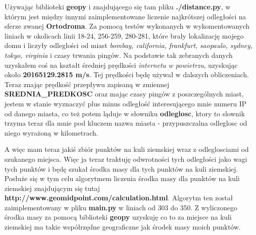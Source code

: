 \documentclass[11pt,a4paper]{article}
\begin{document}
Używając biblioteki \textbf{geopy} i znajdującego się tam pliku \textbf{./distance.py}, w którym jest między innymi zaimplementowane liczenie najkrótszej odległości na sferze zwanej \textbf{Ortodroma}. Za pomocą testów wykonanych w wykomentowanych liniach w okolicach linii 18-24, 256-259, 280-281, które brały lokalizację mojego domu i liczyły odleglości od miast \textit{bombay, california, frankfurt, saopaulo, sydney, tokyo, virginia} i czasy trwania pingów. Na podstawie tak zebranych danych uzyskałem coś na kształt
średniej prędkości \textit{internetu w powietrzu}, uzyskując około \textbf{20165129.2815 m/s}. Tej prędkości będę używał w dalszych obliczeniach. Teraz znając prędkość przepływu zapisaną w zmiennej \textbf{SREDNIA\_PREDKOSC} oraz mając czasy pingów z poszczególnych miast, jestem w stanie wyznaczyć plus minus odległość interesującego mnie numeru IP od danego miasta, co też potem ląduje w słowniku \textbf{odleglosc}, ktory to slownik trzyma teraz dla mnie pod kluczem nazwa miasta - przypuszczalna odleglosc od niego wyrażoną w kilometrach.

A więc mam teraz jakiś zbiór punktów na kuli ziemskiej wraz z odleglosciami od szukanego miejsca. Więc ja teraz traktuję odwrotności tych odległości jako wagi tych punktów i będę szukał środka masy dla tych punktów na kuli ziemskiej. Posłuże się w tym celu algorytmem liczenia środka masy dla punktów na kuli ziemskiej znajdującym się tutaj \textbf{http://www.geomidpoint.com/calculation.html}. Algorytm ten został zaimplementowany w pliku \textbf{main.py} w liniach od 303 do 350. Z wyliczonego środka masy za pomocą biblioteki \textbf{geopy} uzyskuję co to za miejsce na kuli ziemskiej ma takie współrzędne geograficzne jak środek masy moich punktów.
\end{document}
